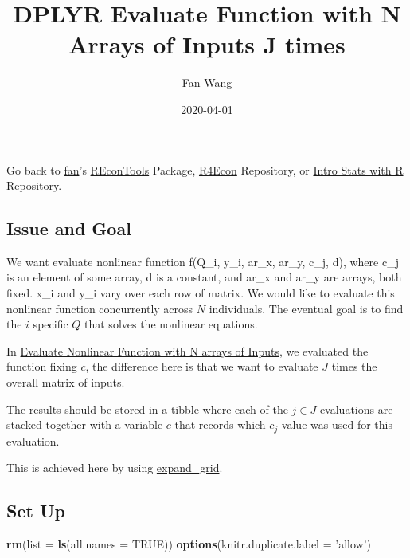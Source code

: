 \documentclass[
]{article}
\title{DPLYR Evaluate Function with N Arrays of Inputs J times}
\author{Fan Wang}
\date{2020-04-01}
\newenvironment{Shaded}{\begin{snugshade}}{\end{snugshade}}
\newcommand{\DataTypeTok}[1]{\textcolor[rgb]{0.13,0.29,0.53}{#1}}
\newcommand{\KeywordTok}[1]{\textcolor[rgb]{0.13,0.29,0.53}{\textbf{#1}}}
\newcommand{\NormalTok}[1]{#1}
\newcommand{\OtherTok}[1]{\textcolor[rgb]{0.56,0.35,0.01}{#1}}
\newcommand{\StringTok}[1]{\textcolor[rgb]{0.31,0.60,0.02}{#1}}
\begin{document}
\maketitle

Go back to \href{http://fanwangecon.github.io/}{fan}'s
\href{https://fanwangecon.github.io/REconTools/}{REconTools} Package,
\href{https://fanwangecon.github.io/R4Econ/}{R4Econ} Repository, or
\href{https://fanwangecon.github.io/Stat4Econ/}{Intro Stats with R}
Repository.

\hypertarget{issue-and-goal}{%
\subsection{Issue and Goal}\label{issue-and-goal}}

We want evaluate nonlinear function f(Q\_i, y\_i, ar\_x, ar\_y, c\_j,
d), where c\_j is an element of some array, d is a constant, and ar\_x
and ar\_y are arrays, both fixed. x\_i and y\_i vary over each row of
matrix. We would like to evaluate this nonlinear function concurrently
across \(N\) individuals. The eventual goal is to find the \(i\)
specific \(Q\) that solves the nonlinear equations.

In
\href{https://fanwangecon.github.io/R4Econ/function/mutatef/fs_funceval.html}{Evaluate
Nonlinear Function with N arrays of Inputs}, we evaluated the function
fixing \(c\), the difference here is that we want to evaluate \(J\)
times the overall matrix of inputs.

The results should be stored in a tibble where each of the \(j \in J\)
evaluations are stacked together with a variable \(c\) that records
which \(c_j\) value was used for this evaluation.

This is achieved here by using
\href{https://fanwangecon.github.io/R4Econ/amto/array/fs_meshr.html}{expand\_grid}.

\hypertarget{set-up}{%
\subsection{Set Up}\label{set-up}}

\begin{Shaded}
\begin{Highlighting}[]
\KeywordTok{rm}\NormalTok{(}\DataTypeTok{list =} \KeywordTok{ls}\NormalTok{(}\DataTypeTok{all.names =} \OtherTok{TRUE}\NormalTok{))}
\KeywordTok{options}\NormalTok{(}\DataTypeTok{knitr.duplicate.label =} \StringTok{'allow'}\NormalTok{)}
\end{Highlighting}
\end{Shaded}
\end{document}
